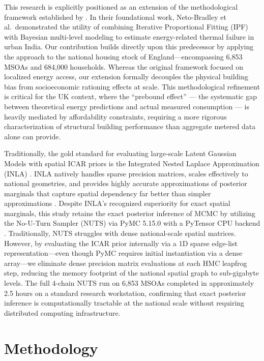 \documentclass[11pt, a4paper, twocolumn, numbers]{elsarticle}
\begin{document}
This research is explicitly positioned as an extension of the 
methodological framework established by \cite{NetoBradley2021}. 
In their foundational work, Neto-Bradley et al.~demonstrated the utility 
of combining Iterative Proportional Fitting (IPF) with Bayesian multi-level modeling 
to estimate energy-related thermal failure in urban India. Our 
contribution builds directly upon this predecessor by applying the 
approach to the national housing stock of England---encompassing 6,853 MSOAs 
and 684,000 households. Whereas the original framework focused on localized energy 
access, our extension formally decouples the physical building bias from 
socioeconomic rationing effects at scale. This methodological refinement is 
critical for the UK context, where the ``prebound effect'' \cite{SunikkaBlank2012} --- the systematic gap between theoretical energy predictions and actual measured consumption --- is heavily mediated by affordability constraints, requiring a more rigorous characterization of structural building performance than aggregate metered data alone can provide.

Traditionally, the gold standard for evaluating large-scale Latent Gaussian Models with spatial ICAR priors is the Integrated Nested Laplace Approximation (INLA) \cite{Rue2009}. INLA natively handles sparse precision matrices, scales effectively to national geometries, and provides highly accurate approximations of posterior marginals that capture spatial dependency far better than simpler approximations \cite{Simpson2017}. Despite INLA's recognized superiority for exact spatial marginals, this study retains the exact posterior inference of MCMC by utilizing the No-U-Turn Sampler (NUTS) via PyMC 5.15.0 with a PyTensor CPU backend \cite{hoffman2014no}. Traditionally, NUTS struggles with dense national-scale spatial matrices. However, by evaluating the ICAR prior internally via a 1D sparse edge-list representation---even though PyMC requires initial instantiation via a dense array---we eliminate dense precision matrix evaluations at each HMC leapfrog step, reducing the memory footprint of the national spatial graph to sub-gigabyte levels. The full 4-chain NUTS run on 6,853 MSOAs completed in approximately 2.5 hours on a standard research workstation, confirming that exact posterior inference is computationally tractable at the national scale without requiring distributed computing infrastructure.

\section{Methodology}\label{methodology-bayesian-computational-architecture}
\end{document}
